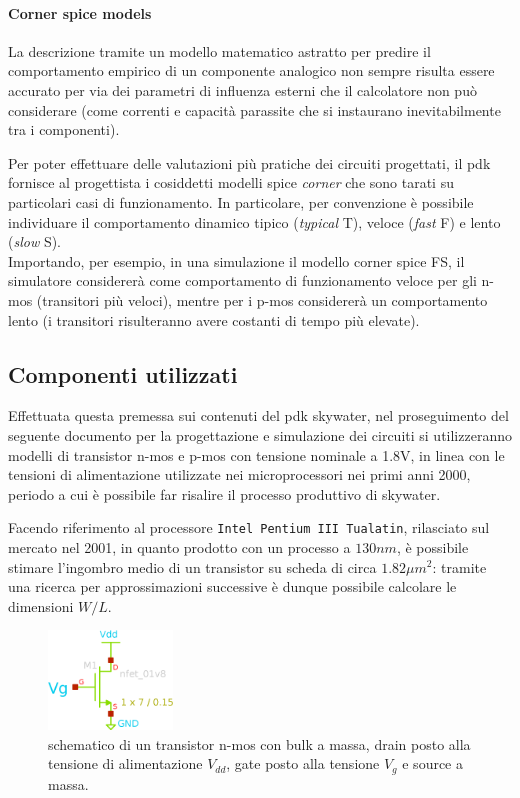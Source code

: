 		\paragraph{Corner spice models} La descrizione tramite un modello matematico astratto per predire il comportamento empirico di un componente analogico non sempre risulta essere accurato per via dei parametri di influenza esterni che il calcolatore non può considerare (come correnti e capacità parassite che si instaurano inevitabilmente tra i componenti).
		
		Per poter effettuare delle valutazioni più pratiche dei circuiti progettati, il pdk fornisce al progettista i cosiddetti modelli spice \textit{corner} che sono tarati su particolari casi di funzionamento. In particolare, per convenzione è possibile individuare il comportamento dinamico tipico (\textit{typical} T), veloce (\textit{fast} F) e lento (\textit{slow} S).\\
		Importando, per esempio, in una simulazione il modello corner spice FS, il simulatore considererà come comportamento di funzionamento veloce per gli n-mos (transitori più veloci), mentre per i p-mos considererà un comportamento lento (i transitori risulteranno avere costanti di tempo più elevate).
		
	\subsection*{Componenti utilizzati}
		Effettuata questa premessa sui contenuti del pdk skywater, nel proseguimento del seguente documento per la progettazione e simulazione dei circuiti si utilizzeranno modelli di transistor n-mos e p-mos con tensione nominale a 1.8V, in linea con le tensioni di alimentazione utilizzate nei microprocessori nei primi anni 2000, periodo a cui è possibile far risalire il processo produttivo di skywater. 
		
		Facendo riferimento al processore \texttt{Intel Pentium III Tualatin}, rilasciato sul mercato nel 2001, in quanto prodotto con un processo a $130nm$, è possibile stimare l'ingombro medio di un transistor su scheda di circa $1.82 \mu m^2$: tramite una ricerca per approssimazioni successive è dunque possibile calcolare le dimensioni $W/L$.
		
		\begin{figure}[bht]
			\centering
			\includegraphics[width=3.3cm]{Immagini/nmos.eps}
			\caption{schematico di un transistor n-mos con bulk a massa, drain posto alla tensione di alimentazione $V_{dd}$, gate posto alla tensione $V_g$ e source a massa.} \label{fig:intro:schematico-nmos}
		\end{figure}
	
